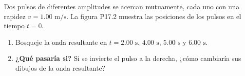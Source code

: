 \item Dos pulsos de diferentes amplitudes se acercan mutuamente, cada uno con una rapidez $v = 1.00\text{ m/s}$. La figura P17.2 muestra las posiciones de los pulsos en el tiempo $t = 0$.
\begin{enumerate}
    \item Bosqueje la onda resultante en $t = 2.00\text{ s}$, $4.00\text{ s}$, $5.00\text{ s}$ y $6.00\text{ s}$.
    \item \textbf{¿Qué pasaría si?} Si se invierte el pulso a la derecha, ¿cómo cambiaría sus dibujos de la onda resultante?
\end{enumerate}